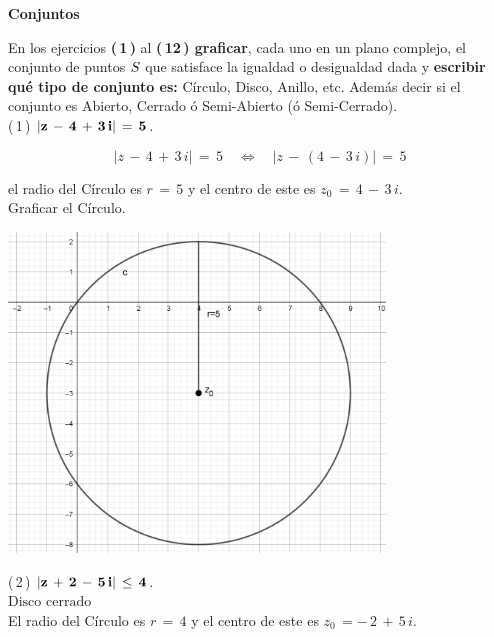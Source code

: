 \documentclass[a4paper,11pt,openany]{book}
\begin{document}
\newpage


\graphicspath{ {images/} }

\begin{center}
\textbf{Conjuntos}
\end{center}

En los ejercicios \textbf{(\,1\,)} al \textbf{(\,12\,) graficar}, cada uno en un plano complejo, el conjunto de puntos $\mathnormal{S}$ que satisface la igualdad o desigualdad dada y \textbf{escribir qué tipo de conjunto es:} Círculo, Disco, Anillo, etc. Además decir si el conjunto es Abierto, Cerrado ó Semi-Abierto (ó Semi-Cerrado).\\

\textcolor{ao(english)}{(\,1\,)} $\bf{|z\,-\,4\,+\,3\,i|\,=\,5}$.

$$|z\,-\,4\,+\,3\,i|\,=\,5 \quad\iff\quad |z\,-\,(4\,-\,3\,i)|\,=\,5$$

el radio del Círculo es $r\,=\,5$ y el centro de este es $z_{0}\,=\,4\,-\,3\,i$.\\

\textcolor{ao(english)}{} Graficar el Círculo.

\begin{center}
     \includegraphics[width=10cm]{Gra-Ej-1.png}
\end{center}

\textcolor{ao(english)}{(\,2\,)} $\bf{|z\,+\,2\,-\,5\,i|\,\leq\,4}$.\\

$\text{Disco cerrado}$\\

El radio del Círculo es $r\,=\,4$ y el centro de este es $z_{0}\,=-\,2\,+\,5\,i$.\\
\end{document}
